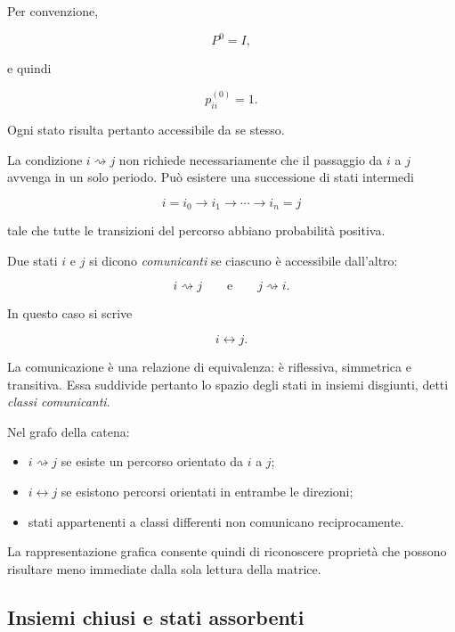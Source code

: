 Per convenzione,

\[
P^0=I,
\]

e quindi

\[
p_{ii}^{(0)}=1.
\]

Ogni stato risulta pertanto accessibile da se stesso.

La condizione \(i\rightsquigarrow j\) non richiede necessariamente che
il passaggio da \(i\) a \(j\) avvenga in un solo periodo. Pu\`{o}
esistere una successione di stati intermedi

\[
i=i_0\longrightarrow i_1\longrightarrow\cdots
\longrightarrow i_n=j
\]

tale che tutte le transizioni del percorso abbiano probabilit\`{a}
positiva.

\begin{definition}
Due stati \(i\) e \(j\) si dicono \emph{comunicanti} se ciascuno
\`{e} accessibile dall'altro:

\[
i\rightsquigarrow j
\qquad\text{e}\qquad
j\rightsquigarrow i.
\]

In questo caso si scrive

\[
i\leftrightarrow j.
\]
\end{definition}

La comunicazione \`{e} una relazione di equivalenza: \`{e} riflessiva,
simmetrica e transitiva. Essa suddivide pertanto lo spazio degli stati
in insiemi disgiunti, detti \emph{classi comunicanti}.

Nel grafo della catena:

\begin{itemize}

\item \(i\rightsquigarrow j\) se esiste un percorso orientato da \(i\)
a \(j\);

\item \(i\leftrightarrow j\) se esistono percorsi orientati in entrambe
le direzioni;

\item stati appartenenti a classi differenti non comunicano
reciprocamente.
\end{itemize}

La rappresentazione grafica consente quindi di riconoscere propriet\`{a}
che possono risultare meno immediate dalla sola lettura della matrice.

\subsection{Insiemi chiusi e stati assorbenti}

